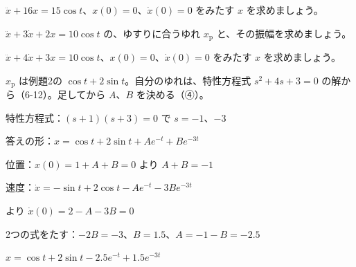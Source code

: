 \noindent\begin{minipage}[t]{0.485\linewidth}\vspace{0pt}
\begin{jibun}\raggedright
$\ddot x+16x=15\cos t$、$x(0)=0$、$\dot x(0)=0$ をみたす $x$ を求めましょう。
\end{jibun}
\end{minipage}\hfill
\begin{minipage}[t]{0.485\linewidth}\vspace{0pt}
\begin{jibun}\raggedright
$\ddot x+3\dot x+2x=10\cos t$ の、ゆすりに合うゆれ $x_{\mathrm p}$ と、その振幅を求めましょう。
\end{jibun}
\end{minipage}

\begin{reidai}
$\ddot x+4\dot x+3x=10\cos t$、$x(0)=0$、$\dot x(0)=0$ をみたす $x$ を求めましょう。\par
\kangaekata $x_{\mathrm p}$ は例題2の $\cos t+2\sin t$。自分のゆれは、特性方程式 $s^2+4s+3=0$ の解から（6-12）。足してから $A$、$B$ を決める（④）。\par
\shiki 特性方程式：$(s+1)(s+3)=0$ で $s=-1$、$-3$\par
\bkvinq 答えの形：$x=\cos t+2\sin t+Ae^{-t}+Be^{-3t}$\par
\bkvinq 位置：$x(0)=1+A+B=0$ より $A+B=-1$\par
\bkvinq 速度：$\dot x=-\sin t+2\cos t-Ae^{-t}-3Be^{-3t}$\par
\bkvinq \phantom{速度：}より $\dot x(0)=2-A-3B=0$\par
\bkvinq 2つの式をたす：$-2B=-3$、$B=1.5$、$A=-1-B=-2.5$\par
\kotae $x=\cos t+2\sin t-2.5e^{-t}+1.5e^{-3t}$
\end{reidai}

